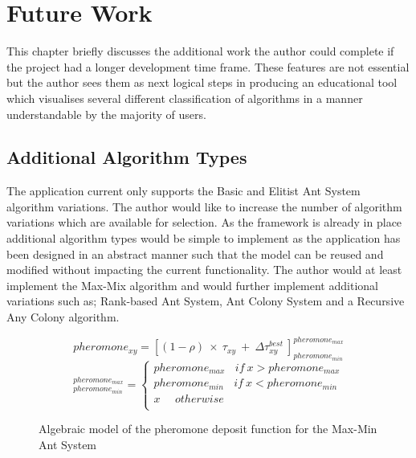 \chapter{Future Work}
\label{footure}
This chapter briefly discusses the additional work the author could complete if the project had a longer development time frame. These features are not essential but the author sees them as next logical steps in producing an educational tool which visualises several different classification of algorithms in a manner understandable by the majority of users.

\section{Additional Algorithm Types}

The application current only supports the Basic and Elitist Ant System algorithm variations. The author would like to increase the number of algorithm variations which are available for selection. As the framework is already in place additional algorithm types would be simple to implement as the application has been designed in an abstract manner such that the model can be reused and modified without impacting the current functionality. The author would at least implement the Max-Mix algorithm and would further implement additional variations such as; Rank-based Ant System, Ant Colony System and a Recursive Any Colony algorithm. 

\begin{figure}[H]
\Large
\begin{equation}
pheromone_{xy} = [(1 - \rho)\ \times\ \tau_{xy}\ +\ \Delta\tau_{xy}^{best}\ ]_{pheromone_{min}}^{pheromone_{max}}
\end{equation}
\begin{equation}
[x]_{pheromone_{min}}^{pheromone_{max}} = \left\{\begin{matrix}
pheromone_{max}\ \ \ \ if\ x > pheromone_{max} \\ 
pheromone_{min}\ \ \ \ if\ x < pheromone_{min} \\ 
x \ \ \ \ \ \ otherwise\\ 
\end{matrix}\right.
\end{equation}

\caption{Algebraic model of the pheromone deposit function for the Max-Min Ant System \cite{AntColontSite:slides}}
\label{MaxMinSystemPhero}

\end{figure}

